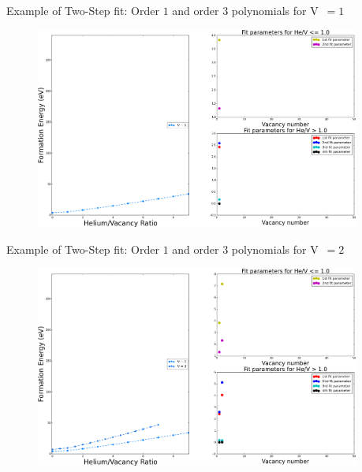 \documentclass[10pt]{beamer}
\begin{document}
\begin{frame}{Example of Two-Step fit:}
	Order $1$ and order $3$ polynomials for V~$= 1$ 
	\begin{figure}
        \includegraphics[width=0.95\textwidth]{fit1DS1}
    \end{figure}
\end{frame}

\begin{frame}{Example of Two-Step fit:}
	Order $1$ and order $3$ polynomials for V~$= 2$
	\begin{figure}
        \includegraphics[width=0.95\textwidth]{fit1DS2}
    \end{figure}
\end{frame}
\end{document}
